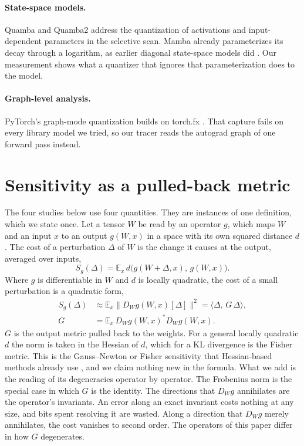 \documentclass[journal]{IEEEtran}
\begin{document}
\paragraph{State-space models.} Quamba \citep{chiang2025quamba} and Quamba2
\citep{chiang2025quamba2} address the quantization of activations and input-dependent
parameters in the selective scan. Mamba \citep{gu2024mamba} already parameterizes its decay
through a logarithm, as earlier diagonal state-space models did \citep{gu2022s4d}. Our
measurement shows what a quantizer that ignores that parameterization does to the model.

\paragraph{Graph-level analysis.} PyTorch's graph-mode quantization builds on torch.fx
\citep{reed2022torchfx}. That capture fails on every library model we tried, so our tracer reads the autograd
graph of one forward pass instead.

\section{Sensitivity as a pulled-back metric}\label{sec:pullback}

The four studies below use four quantities. They are instances of one definition, which we state
once. Let a tensor $W$ be read by an operator $g$, which maps $W$ and an input $x$ to an output
$g(W,x)$ in a space with its own squared distance $d$. The cost of a perturbation $\Delta$ of $W$
is the change it causes at the output, averaged over inputs,
\begin{equation}
S_g(\Delta) = \mathbb{E}_x\, d\bigl(g(W+\Delta,x),\, g(W,x)\bigr).
\label{eq:cost}
\end{equation}
Where $g$ is differentiable in $W$ and $d$ is locally quadratic, the cost of a small perturbation
is a quadratic form,
\begin{equation}
\begin{aligned}
S_g(\Delta) &\approx \mathbb{E}_x \bigl\| D_W g(W,x)[\Delta] \bigr\|^2 = \langle \Delta,\, G\,\Delta\rangle,\\
G &= \mathbb{E}_x\, D_Wg(W,x)^{*} D_Wg(W,x).
\end{aligned}
\label{eq:pullback}
\end{equation}
$G$ is the output metric pulled back to the weights. For a general locally quadratic $d$ the norm
is taken in the Hessian of $d$, which for a KL divergence is the Fisher metric. This is the
Gauss--Newton or Fisher sensitivity that Hessian-based methods already use
\citep{dong2019hawq,frantar2023gptq}, and we claim nothing new in the formula. What we add is the
reading of its degeneracies operator by operator. The Frobenius norm is the special case in
which $G$ is the identity. The directions that $D_Wg$ annihilates are the operator's invariants.
An error along an exact invariant costs nothing at any size, and bits spent resolving it are
wasted. Along a direction that $D_Wg$ merely annihilates, the cost vanishes to second order. The operators of
this paper differ in how $G$ degenerates.
\end{document}
